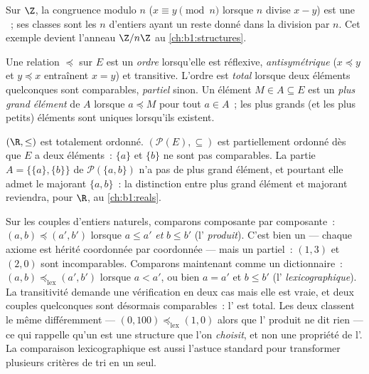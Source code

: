 \begin{example}\label{ex:b1:logic:congruence}
Sur $\Z$, la congruence modulo $n$ ($x \equiv y \pmod n$ lorsque $n$
divise $x - y$) est une ~; ses classes sont les
$n$  d'entiers ayant un reste donné dans la division par $n$.
Cet exemple devient l'anneau $\Z/n\Z$ au \cref{ch:b1:structures}.
\end{example}

\begin{definition}\label{def:b1:logic:order}
Une relation $\preceq$ sur $E$ est un
\emph{ordre} lorsqu'elle est réflexive,
\emph{antisymétrique} ($x \preceq y$ et $y \preceq x$ entraînent
$x = y$) et transitive. L'ordre est
\emph{total} lorsque deux éléments quelconques sont comparables,
\emph{partiel} sinon. Un élément $M \in A \subseteq E$ est un
\emph{plus grand élément} de $A$ lorsque $a \preceq M$ pour tout
$a \in A$~; les plus grands (et les plus petits) éléments sont uniques
lorsqu'ils existent.
\end{definition}

\begin{example}\label{ex:b1:logic:orders}
$(\R, \leq)$ est totalement ordonné. $(\mathcal{P}(E), \subseteq)$ est
partiellement ordonné dès que $E$ a deux éléments~: $\{a\}$ et
$\{b\}$ ne sont pas comparables. La partie $A = \{\{a\}, \{b\}\}$ de
$\mathcal{P}(\{a,b\})$ n'a pas de plus grand élément, et pourtant elle
admet le majorant $\{a, b\}$~: la distinction entre plus grand élément
et majorant reviendra, pour $\R$, au \cref{ch:b1:reals}.
\end{example}

\begin{example}\label{ex:b1:logic:lexorder}
Sur les couples d'entiers naturels, comparons composante par
composante~: $(a, b) \preceq (a', b')$ lorsque $a \leq a'$ \emph{et}
$b \leq b'$ (l'\emph{ produit}). C'est bien un  --- chaque
axiome est hérité coordonnée par coordonnée --- mais un  partiel~:
$(1, 3)$ et $(2, 0)$ sont incomparables. Comparons maintenant comme un
dictionnaire~: $(a, b) \preceq_{\mathrm{lex}} (a', b')$ lorsque
$a < a'$, ou bien $a = a'$ et $b \leq b'$ (l'\emph{
lexicographique}). La transitivité demande une vérification en deux cas
mais elle est vraie, et deux couples quelconques sont désormais
comparables~: l' est total. Les deux  classent le même
 différemment --- $(0, 100) \preceq_{\mathrm{lex}} (1, 0)$ alors
que l' produit ne dit rien --- ce qui rappelle qu'un  est une
structure que l'on \emph{choisit}, et non une propriété de l'.
La comparaison lexicographique est aussi l'astuce standard pour
transformer plusieurs critères de tri en un seul.
\end{example}


